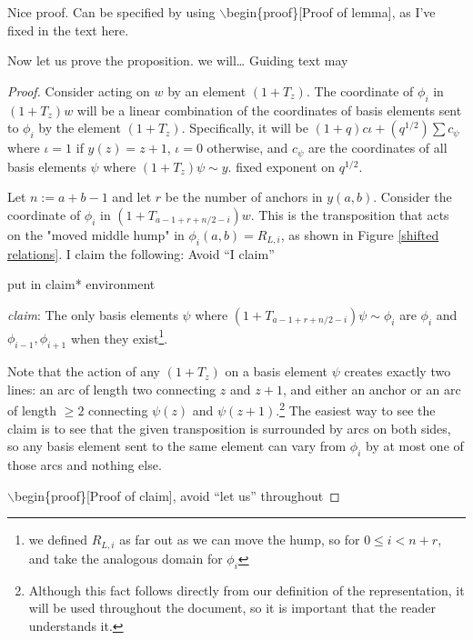 \documentclass{amsart}
\begin{document}
{\color{magenta} Nice proof.
Can be specified by using $\backslash$begin\{proof\}[Proof of lemma], as I've fixed in the text here.}

Now let us prove the proposition.
{\color{magenta} we will\ldots
Guiding text may 
}

\begin{proof}
  Consider acting on $w$ by an element $(1+T_z)$. The coordinate of $\phi_i$ in $(1+T_z)w$ will be a linear combination of the coordinates of basis elements sent to $\phi_i$ by the element $(1+T_z)$. Specifically, it will be $(1+q)c\iota+(q^{1/2})\sum c_\psi$ where $\iota=1$ if $y(z)=z+1$, $\iota=0$ otherwise, and $c_\psi$ are the coordinates of all basis elements $\psi$ where $(1+T_z)\psi\sim y$.
  {\color{magenta} fixed exponent on $q^{1/2}$.}

  Let $n:=a+b-1$ and {\color{magenta} let } $r$ be the number of anchors in $y(a,b)$. Consider the coordinate of $\phi_i$ in $(1+T_{a-1+r+n/2-i})w$. This is the transposition that acts on the "moved middle hump" in $\phi_i(a,b)=R_{L,i}$, as shown in {\color{magenta} Figure }\ref{shifted relations}. 
  I claim the following:
  {\color{magenta} Avoid ``I claim''}
	
  {\color{magenta} put in claim* environment}
	\begin{center}
		\textit{claim}:
		The only basis elements $\psi$ where $(1+T_{a-1+r+n/2-i})\psi\sim \phi_i$ are $\phi_i$ and $\phi_{i-1},\phi_{i+1}$ when they exist\footnote{we defined $R_{L,i}$ as far out as we can move the hump, so for $0\leq i<n+r$, and take the analogous domain for $\phi_i$}.
		
	\end{center}
	
	Note that the action of any $(1+T_z)$ on a basis element $\psi$ creates exactly two lines: an arc of length two connecting $z$ and $z+1$, and either an anchor or an arc of length $\geq 2$ connecting $\psi(z)$ and $\psi(z+1)$.\footnote{Although this fact follows directly from our definition of the representation, it will be used throughout the document, so it is important that the reader understands it.\label{two humps created}} The easiest way to see the claim is to see that the given transposition is surrounded by arcs on both sides, so any basis element sent to the same element can vary from $\phi_i$ by at most one of those arcs and nothing else. 
	
  {\color{magenta} $\backslash$begin\{proof\}[Proof of claim], avoid ``let us'' throughout}


\end{proof}
\end{document}
